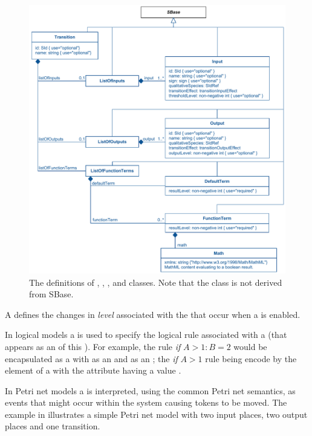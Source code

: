 \begin{figure}
  \includegraphics{figs/qual-transition-uml.pdf}
  \caption{The definitions of \Transition, \Input, \Output, \DefaultTerm and \FunctionTerm classes. Note that the \DefaultTerm class is not derived from SBase. }
  \label{qual-transition-uml}
\end{figure}


A \Transition defines the changes in \emph{level} associated with the \QualitativeSpecies  that occur when a \Transition is enabled.  


\pagebreak


In logical models a \Transition is used to specify the logical rule associated with a \QualitativeSpecies (that appears as an \Output of this \Transition). For example, the rule \textit{if} $A > 1: B = 2$ would be encapsulated as a \Transition with \QualitativeSpecies {} as an \Input and  as an \Output; the \textit{if} $A > 1$ rule being encode by the  element of a \FunctionTerm with the  attribute having a value . 


In Petri net models a \Transition is interpreted, using the common Petri net semantics, as events that might occur within the system causing tokens to be moved. The example  in  illustrates a simple Petri net model with two input places, two output places and one transition.



